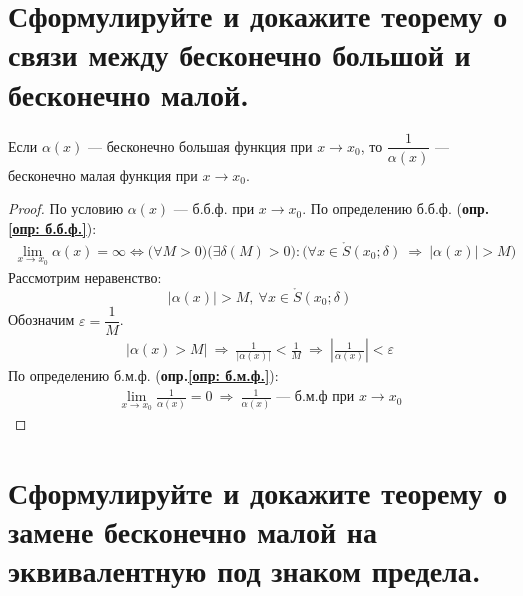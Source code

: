 \newpage
\section{Сформулируйте и докажите теорему о связи между бесконечно большой и бесконечно малой.}

\begin{theorem}
  Если $\alpha(x)$ --- бесконечно большая функция при $x \to x_0$, то $\dfrac{1}{\alpha(x)}$ --- бесконечно малая функция при $x \to x_0$.
\end{theorem}
\begin{proof}
  По условию $\alpha(x)$ --- б.б.ф. при $x \to x_0$. По определению б.б.ф. (\textbf{опр.\ref{опр: б.б.ф.}}):
  \begin{gather*}
    \lim_{x \to x_0} \alpha(x) = \infty \iff \big(\forall M > 0\big)\big(\exists \delta(M) > 0\big)\colon \big(\forall x \in \mathring{S}(x_0; \delta)\ \Rightarrow\ |\alpha(x)| > M\big)
  \end{gather*}
  Рассмотрим неравенство: \[
    |\alpha(x)| > M,\ \forall x \in \mathring{S}(x_0; \delta)
  \]
  Обозначим $\varepsilon = \dfrac{1}{M}$.
  \begin{gather*}
    |\alpha(x) > M|\ \Rightarrow\ \frac{1}{|\alpha(x)|} < \frac{1}{M}
   \ \Rightarrow\ \left| \frac{1}{\alpha(x)} \right| < \varepsilon
  \end{gather*}
  По определению б.м.ф. (\textbf{опр.\ref{опр: б.м.ф.}}):
  \begin{gather*}
    \lim\limits_{x \to x_0} \frac{1}{\alpha(x)} = 0\ \Rightarrow\ \frac{1}{\alpha(x)} \text{ --- б.м.ф при } x\to x_0
  \end{gather*}
\end{proof}

\section{Сформулируйте и докажите теорему о замене бесконечно малой на эквивалентную под знаком предела.}

